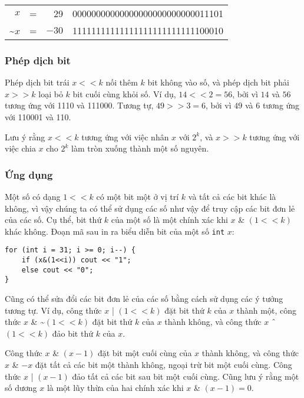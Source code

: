 \begin{center}
\begin{tabular}{rrrr}
$x$ & = & 29 &   00000000000000000000000000011101 \\
\textasciitilde$x$ & = & $-30$ & 11111111111111111111111111100010 \\
\end{tabular}
\end{center}

\subsubsection{Phép dịch bit}


Phép dịch bit trái $x < < k$ nối thêm $k$
bit không vào số,
và phép dịch bit phải $x > > k$
loại bỏ $k$ bit cuối cùng khỏi số.
Ví dụ, $14 < < 2 = 56$,
bởi vì $14$ và $56$ tương ứng với 1110 và 111000.
Tương tự, $49 > > 3 = 6$,
bởi vì $49$ và $6$ tương ứng với 110001 và 110.

Lưu ý rằng $x < < k$
tương ứng với việc nhân $x$ với $2^k$,
và $x > > k$
tương ứng với việc chia $x$ cho $2^k$
làm tròn xuống thành một số nguyên.

\subsubsection{Ứng dụng}

Một số có dạng $1 < < k$ có một bit một
ở vị trí $k$ và tất cả các bit khác là không,
vì vậy chúng ta có thể sử dụng các số như vậy để truy cập các bit đơn lẻ của các số.
Cụ thể, bit thứ $k$ của một số là một
chính xác khi $x$ \& $(1 < < k)$ khác không.
Đoạn mã sau in ra biểu diễn bit
của một số \texttt{int} $x$:

\begin{lstlisting}
for (int i = 31; i >= 0; i--) {
    if (x&(1<<i)) cout << "1";
    else cout << "0";
}
\end{lstlisting}

Cũng có thể sửa đổi các bit đơn lẻ
của các số bằng cách sử dụng các ý tưởng tương tự.
Ví dụ, công thức $x$ | $(1 < < k)$
đặt bit thứ $k$ của $x$ thành một,
công thức
$x$ \& \textasciitilde $(1 < < k)$
đặt bit thứ $k$ của $x$ thành không,
và công thức
$x$ $\XOR$ $(1 < < k)$
đảo bit thứ $k$ của $x$.

Công thức $x$ \& $(x-1)$ đặt bit
một cuối cùng của $x$ thành không,
và công thức $x$ \& $-x$ đặt tất cả các
bit một thành không, ngoại trừ bit một cuối cùng.
Công thức $x$ | $(x-1)$
đảo tất cả các bit sau bit một cuối cùng.
Cũng lưu ý rằng một số dương $x$ là
một lũy thừa của hai chính xác khi $x$ \& $(x-1) = 0$.

